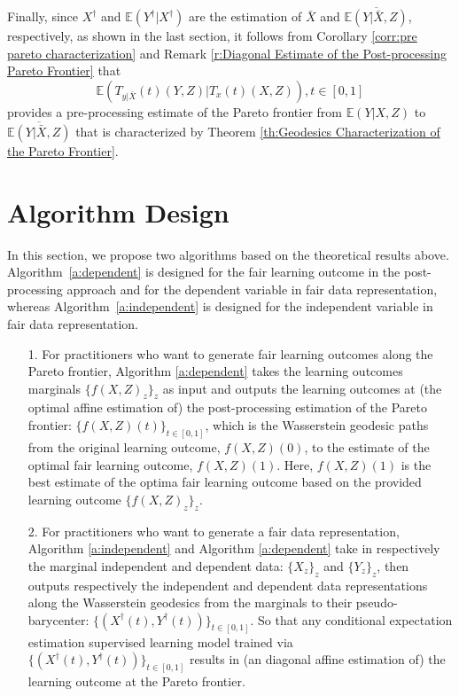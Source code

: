 \documentclass[twoside,11pt]{article}
\begin{document}
Finally, since $X^{\dag}$ and $\mathbb{E}(Y^{\dag}|X^{\dag})$ are the estimation of $\bar{X}$ and $\overline{\mathbb{E}(Y|\bar{X},Z)}$, respectively, as shown in the last section, it follows from Corollary \ref{corr:pre pareto characterization} and Remark \ref{r:Diagonal Estimate of the Post-processing Pareto Frontier} that 
\begin{equation}
\mathbb{E}(T_{y|\bar{X}}(t)(Y,Z)|T_x(t)(X,Z)), t \in [0,1]
\end{equation}
provides a pre-processing estimate of the Pareto frontier from $\mathbb{E}(Y|X,Z)$ to $\overline{\mathbb{E}(Y|\bar{X},Z)}$ that is characterized by Theorem \ref{th:Geodesics Characterization of the Pareto Frontier}.

\section{Algorithm Design}\label{s:Algorithm}

In this section, we propose two algorithms based on the theoretical results above. Algorithm~\ref{a:dependent} is designed for the fair learning outcome in the post-processing approach and for the dependent variable in fair data representation, whereas Algorithm~\ref{a:independent} is designed for the independent variable in fair data representation.
\begin{itemize}
\setlength{\parsep}{-0.2ex}
\setlength{\itemsep}{-0.2ex}
\item[1.] For practitioners who want to generate fair learning outcomes along the Pareto frontier, Algorithm \ref{a:dependent} takes the learning outcomes marginals $\{f(X,Z)_z\}_z$ as input and outputs the learning outcomes at (the optimal affine estimation of) the post-processing estimation of the Pareto frontier: $\{f(X,Z)(t)\}_{t \in [0,1]}$, which is the Wasserstein geodesic paths from the original learning outcome, $f(X,Z)(0)$, to the estimate of the optimal fair learning outcome, $f(X,Z)(1)$. Here, $f(X,Z)(1)$ is the best estimate of the optima fair learning outcome based on the provided learning outcome $\{f(X,Z)_z\}_z$.
\item[2.] For practitioners who want to generate a fair data representation, Algorithm \ref{a:independent} and Algorithm \ref{a:dependent} take in respectively the marginal independent and dependent data: $\{X_z\}_z$ and $\{Y_z\}_z$, then outputs respectively the independent and dependent data representations along the Wasserstein geodesics from the marginals to their pseudo-barycenter: $\{(X^{\dag}(t),Y^{\dag}(t))\}_{t \in [0,1]}$.  So that any conditional expectation estimation supervised learning model trained via $\{(X^{\dag}(t),Y^{\dag}(t))\}_{t \in [0,1]}$ results in (an diagonal affine estimation of) the learning outcome at the Pareto frontier.
\end{itemize}
\end{document}
